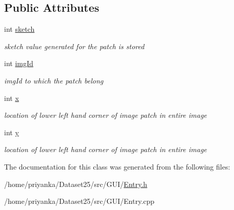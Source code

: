 \subsection*{\-Public \-Attributes}
\begin{DoxyCompactItemize}
\item 
\hypertarget{classEntry_afde1f6b07cee7ad7631478331fe408d1}{int \hyperlink{classEntry_afde1f6b07cee7ad7631478331fe408d1}{sketch}}\label{classEntry_afde1f6b07cee7ad7631478331fe408d1}

\begin{DoxyCompactList}\small\item\em sketch value generated for the patch is stored \end{DoxyCompactList}\item 
\hypertarget{classEntry_a737aa8df82530d927377e9c5e9bb9fae}{int \hyperlink{classEntry_a737aa8df82530d927377e9c5e9bb9fae}{img\-Id}}\label{classEntry_a737aa8df82530d927377e9c5e9bb9fae}

\begin{DoxyCompactList}\small\item\em img\-Id to which the patch belong \end{DoxyCompactList}\item 
\hypertarget{classEntry_a4d5d860d6b330e58c75cade1ada74881}{int \hyperlink{classEntry_a4d5d860d6b330e58c75cade1ada74881}{x}}\label{classEntry_a4d5d860d6b330e58c75cade1ada74881}

\begin{DoxyCompactList}\small\item\em location of lower left hand corner of image patch in entire image \end{DoxyCompactList}\item 
\hypertarget{classEntry_aab8ab2b5e5357e38214b97b3dabd3856}{int \hyperlink{classEntry_aab8ab2b5e5357e38214b97b3dabd3856}{y}}\label{classEntry_aab8ab2b5e5357e38214b97b3dabd3856}

\begin{DoxyCompactList}\small\item\em location of lower left hand corner of image patch in entire image \end{DoxyCompactList}\end{DoxyCompactItemize}


\-The documentation for this class was generated from the following files\-:\begin{DoxyCompactItemize}
\item 
/home/priyanka/\-Dataset25/src/\-G\-U\-I/\hyperlink{Entry_8h}{\-Entry.\-h}\item 
/home/priyanka/\-Dataset25/src/\-G\-U\-I/\-Entry.\-cpp\end{DoxyCompactItemize}
